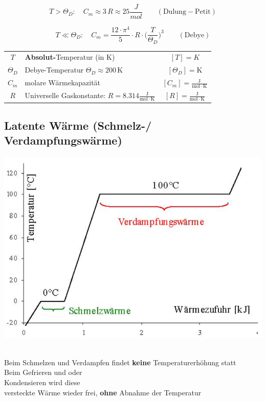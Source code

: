 $$ T > \Theta_D: \quad C_m \approx 3 \, R \approx 25 \frac{J}{mol}  \qquad \mathrm{(Dulung-Petit)}$$

$$ T \ll \Theta_D: \quad C_m = \frac{12 \cdot \pi^4}{5}  \cdot R \cdot  \Big( \frac{T}{\Theta_D}  \Big)^3 \qquad \mathrm{(Debye)}  $$


\begin{tabular}{c l c}
	$T$ & \textbf{Absolut-}Temperatur (in K) & $[T] = K$ \\
	$\Theta_D$ & Debye-Temperatur $\Theta_D \approx 200 \, \mathrm{K}$ & $[\Theta_D] = \mathrm{K}$ \\
	\rule{0pt}{8pt}$C_m$ & molare Wärmekapazität & $[C_m] = \mathrm{\frac{J}{mol \cdot K}}$ \\
	\rule{0pt}{8pt}$R$ & Universelle Gaskonstante: $R = 8.314 \mathrm{\frac{J}{mol \cdot K}}$ & $[R] = \mathrm{\frac{J}{mol \cdot K}} $ \\
\end{tabular}




\subsection{Latente Wärme (Schmelz-/ Verdampfungswärme)}



\begin{minipage}{0.5\linewidth}
\includegraphics[width=0.99\linewidth]{Bilder/latente_waerme_2}\\
\\
\end{minipage}
\hfill
\begin{minipage}{0.5\linewidth}
Beim Schmelzen und Verdampfen findet \textbf{keine} Temperaturerhöhung statt \\
Beim Gefrieren und oder \\
Kondensieren wird diese \\
versteckte Wärme wieder frei, \textbf{ohne} Abnahme der Temperatur \\
\\
\end{minipage}

